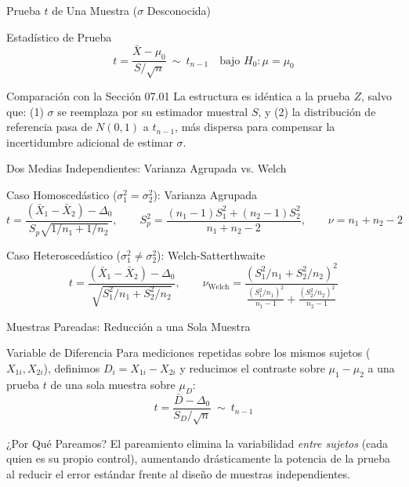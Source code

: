 \documentclass[10pt, aspectratio=169]{beamer}
\begin{document}
\begin{frame}{Prueba $t$ de Una Muestra ($\sigma$ Desconocida)}
  \footnotesize
  \begin{block}{Estadístico de Prueba}
    $$t = \frac{\bar X - \mu_0}{S/\sqrt n} \ \sim\ t_{n-1} \quad \text{bajo } H_0: \mu=\mu_0$$
  \end{block}
  \pause

  \vspace{0.1cm}
  \begin{alertblock}{Comparación con la Sección 07.01}
    La estructura es idéntica a la prueba $Z$, salvo que: (1) $\sigma$ se reemplaza por su estimador muestral $S$, y (2) la distribución de referencia pasa de $N(0,1)$ a $t_{n-1}$, más dispersa para compensar la incertidumbre adicional de estimar $\sigma$.
  \end{alertblock}
\end{frame}

\begin{frame}{Dos Medias Independientes: Varianza Agrupada vs. Welch}
  \footnotesize
  \begin{block}{Caso Homoscedástico ($\sigma_1^2=\sigma_2^2$): Varianza Agrupada}
    $$t = \frac{(\bar X_1-\bar X_2)-\Delta_0}{S_p\sqrt{1/n_1+1/n_2}}, \qquad S_p^2 = \frac{(n_1-1)S_1^2+(n_2-1)S_2^2}{n_1+n_2-2}, \qquad \nu=n_1+n_2-2$$
  \end{block}
  \pause

  \vspace{0.1cm}
  \begin{alertblock}{Caso Heteroscedástico ($\sigma_1^2\neq\sigma_2^2$): Welch-Satterthwaite}
    $$t = \frac{(\bar X_1-\bar X_2)-\Delta_0}{\sqrt{S_1^2/n_1+S_2^2/n_2}}, \qquad \nu_{\text{Welch}} = \frac{(S_1^2/n_1+S_2^2/n_2)^2}{\frac{(S_1^2/n_1)^2}{n_1-1}+\frac{(S_2^2/n_2)^2}{n_2-1}}$$
  \end{alertblock}
\end{frame}

\begin{frame}{Muestras Pareadas: Reducción a una Sola Muestra}
  \footnotesize
  \begin{block}{Variable de Diferencia}
    Para mediciones repetidas sobre los mismos sujetos ($X_{1i}, X_{2i}$), definimos $D_i=X_{1i}-X_{2i}$ y reducimos el contraste sobre $\mu_1-\mu_2$ a una prueba $t$ de una sola muestra sobre $\mu_D$:
    $$t = \frac{\bar D - \Delta_0}{S_D/\sqrt n} \ \sim\ t_{n-1}$$
  \end{block}
  \pause

  \vspace{0.1cm}
  \begin{alertblock}{¿Por Qué Pareamos?}
    El pareamiento elimina la variabilidad \emph{entre sujetos} (cada quien es su propio control), aumentando drásticamente la potencia de la prueba al reducir el error estándar frente al diseño de muestras independientes.
  \end{alertblock}
\end{frame}
\end{document}
